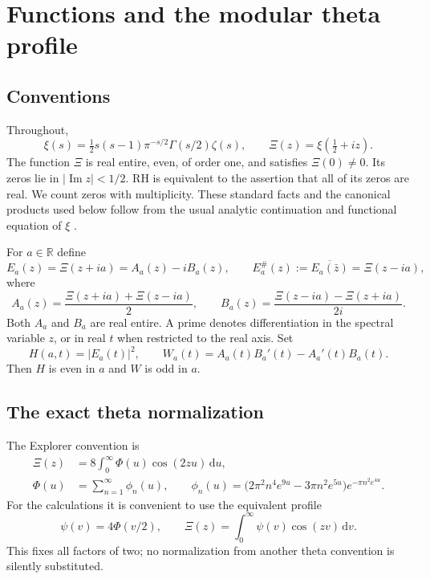 \documentclass[11pt,letterpaper]{article}
\numberwithin{equation}{section}
\theoremstyle{definition}
\theoremstyle{remark}
\newcommand{\R}{\mathbb R}
\newcommand{\dd}{\,\mathrm d}
\newcommand{\Impart}{\operatorname{Im}}
\begin{document}
\section{Functions and the modular theta profile}
\subsection{Conventions}
Throughout,
\begin{equation}\label{eq:xi}
\xi(s)=\tfrac12s(s-1)\pi^{-s/2}\Gamma(s/2)\zeta(s),\qquad
\Xi(z)=\xi(\tfrac12+iz).
\end{equation}
The function $\Xi$ is real entire, even, of order one, and satisfies $\Xi(0)\ne0$. Its zeros lie in $|\Impart z|<1/2$. RH is equivalent to the assertion that all of its zeros are real. We count zeros with multiplicity. These standard facts and the canonical products used below follow from the usual analytic continuation and functional equation of $\xi$ \cite{dlmf,lagarias}.

For $a\in\R$ define
\begin{equation}\label{eq:pair}
E_a(z)=\Xi(z+ia)=A_a(z)-iB_a(z),\qquad
E_a^\#(z):=\overline{E_a(\bar z)}=\Xi(z-ia),
\end{equation}
where
\begin{equation}\label{eq:AB}
A_a(z)=\frac{\Xi(z+ia)+\Xi(z-ia)}2,\qquad
B_a(z)=\frac{\Xi(z-ia)-\Xi(z+ia)}{2i}.
\end{equation}
Both $A_a$ and $B_a$ are real entire. A prime denotes differentiation in the spectral variable $z$, or in real $t$ when restricted to the real axis. Set
\begin{equation}\label{eq:HW}
H(a,t)=|E_a(t)|^2,\qquad
W_a(t)=A_a(t)B_a'(t)-A_a'(t)B_a(t).
\end{equation}
Then $H$ is even in $a$ and $W$ is odd in $a$.

\subsection{The exact theta normalization}
The Explorer convention is
\begin{align}
\Xi(z)&=8\int_0^\infty\Phi(u)\cos(2zu)\dd u,\label{eq:PhiTransform}\\
\Phi(u)&=\sum_{n=1}^\infty\phi_n(u),\qquad
\phi_n(u)=\bigl(2\pi^2n^4e^{9u}-3\pi n^2e^{5u}\bigr)e^{-\pi n^2e^{4u}}.\label{eq:Phi}
\end{align}
For the calculations it is convenient to use the equivalent profile
\begin{equation}\label{eq:psi}
\psi(v)=4\Phi(v/2),\qquad
\Xi(z)=\int_0^\infty\psi(v)\cos(zv)\dd v.
\end{equation}
This fixes all factors of two; no normalization from another theta convention is silently substituted.
\end{document}
